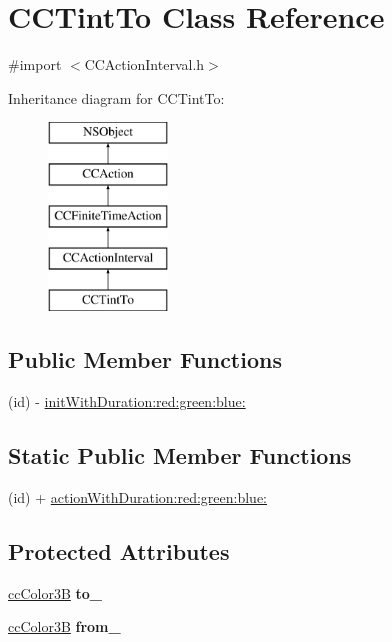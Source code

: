 \hypertarget{interface_c_c_tint_to}{\section{C\-C\-Tint\-To Class Reference}
\label{interface_c_c_tint_to}
}


{\ttfamily \#import $<$C\-C\-Action\-Interval.\-h$>$}

Inheritance diagram for C\-C\-Tint\-To\-:\begin{figure}[H]
\begin{center}
\leavevmode
\includegraphics[height=5.000000cm]{interface_c_c_tint_to}
\end{center}
\end{figure}
\subsection*{Public Member Functions}
\begin{DoxyCompactItemize}
\item 
(id) -\/ \hyperlink{interface_c_c_tint_to_a045ab7235c483ed4403442be9892819c}{init\-With\-Duration\-:red\-:green\-:blue\-:}
\end{DoxyCompactItemize}
\subsection*{Static Public Member Functions}
\begin{DoxyCompactItemize}
\item 
(id) + \hyperlink{interface_c_c_tint_to_a4f474aafb5cbd8456f8a9480738325fb}{action\-With\-Duration\-:red\-:green\-:blue\-:}
\end{DoxyCompactItemize}
\subsection*{Protected Attributes}
\begin{DoxyCompactItemize}
\item 
\hypertarget{interface_c_c_tint_to_ab394a5088a2bdda56673a117337d6422}{\hyperlink{cc_types_8h_a829b00c53e72f0115e3880cb508fec1e}{cc\-Color3\-B} {\bfseries to\-\_\-}}\label{interface_c_c_tint_to_ab394a5088a2bdda56673a117337d6422}

\item 
\hypertarget{interface_c_c_tint_to_a65f8f00467d4399a4433d70b60da4019}{\hyperlink{cc_types_8h_a829b00c53e72f0115e3880cb508fec1e}{cc\-Color3\-B} {\bfseries from\-\_\-}}\label{interface_c_c_tint_to_a65f8f00467d4399a4433d70b60da4019}

\end{DoxyCompactItemize}


